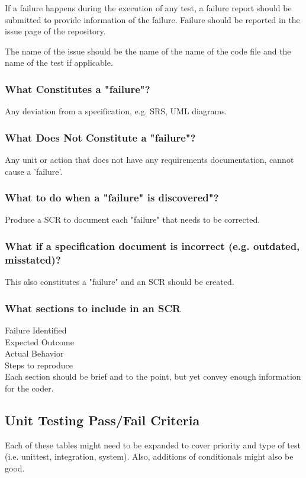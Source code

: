 \documentclass[report]{article}
\begin{document}
If a failure happens during the execution of any test, a failure report should be submitted to provide information of the failure. Failure should be reported in the issue page of the repository. 

The name of the issue should be the name of the name of the code file and the name of the test if applicable.

\subsubsection{What Constitutes a "failure"?}
Any deviation from a specification, e.g. SRS, UML diagrams.

\subsubsection{What Does Not Constitute a "failure"?}
Any unit or action that does not have any requirements documentation, cannot cause a 'failure'.

\subsubsection{What to do when a "failure" is discovered"?}
Produce a SCR to document each "failure" that needs to be corrected.

\subsubsection{What if a specification document is incorrect (e.g. outdated, misstated)?}
This also constitutes a "failure" and an SCR should be created.

\subsubsection{What sections to include in an SCR}

Failure Identified\\
Expected Outcome \\
Actual Behavior \\
Steps to reproduce \\

Each section should be brief and to the point, but yet convey enough information for the coder.

\subsection{Unit Testing Pass/Fail Criteria}
Each of these tables might need to be expanded to cover priority and type of test (i.e. unittest, integration, system). Also, additions of conditionals might also be good.
\end{document}
